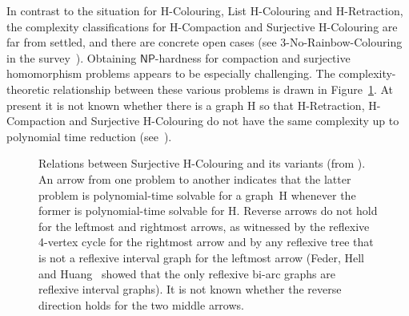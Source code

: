 \documentclass[a4paper,12pt]{article}
\theoremstyle{remark}
\newcommand{\NP}[0]{\ensuremath{\mathsf{NP}}}
\renewcommand{\H}{\ensuremath{\mathrm{H}}}
\begin{document}
In contrast to the situation for {\sc $\H$-Colouring}, {\sc List $\H$-Colouring} and
{\sc $\H$-Retraction},
 the complexity classifications for {\sc $\H$-Compaction} and {\sc Surjective $\H$-Colouring} are far from settled, and there are concrete open cases (see {\sc $3$-No-Rainbow-Colouring} in the survey~\cite{SurHomSurvey}). Obtaining \NP-hardness for compaction and surjective homomorphism problems appears to be especially challenging. The complexity-theoretic relationship between these various problems is drawn in Figure~\ref{fig:Anthony}.
At present it is not known whether there is a graph $\H$ so that {\sc $\H$-Retraction},  {\sc $\H$-Compaction} and {\sc Surjective $\H$-Colouring} do not have the same complexity up to polynomial time reduction (see~\cite{CiE2017,VikasOther}).

\begin{figure}
\begin{centering}
\newcommand{\separation}{3mm}
\caption{Relations between {\sc Surjective $\H$-Colouring} and its variants (from \cite{CiE2017}). An arrow from one problem to another indicates that the latter problem is polynomial-time solvable for a graph~$\H$ whenever the former is polynomial-time solvable for $\H$. Reverse arrows do not hold for the leftmost and rightmost arrows,
as witnessed by the reflexive 4-vertex cycle for the rightmost arrow and by any reflexive tree that is not a reflexive interval graph for the leftmost arrow (Feder, Hell and Huang~\cite{FHH03} showed that the only reflexive bi-arc graphs are reflexive interval graphs).
It is not known whether the reverse direction holds for the two middle arrows.}
\label{fig:Anthony}
\end{centering}	
\end{figure}
\end{document}
